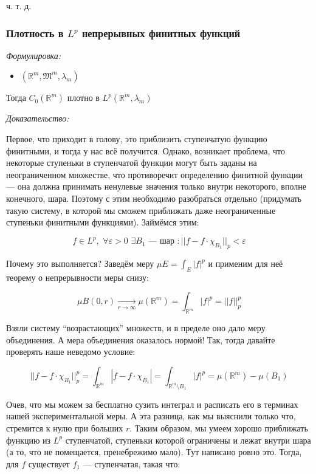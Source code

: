 \documentclass{article}
\def\dbl{\,\,}
\def\goesto#1{\underset{#1}{\longrightarrow}}
\begin{document}
ч. т. д. 

\subsubsection{Плотность в $L^p$ непрерывных финитных функций}
\textit{Формулировка:}

\begin{itemize}
    \item $(\mathbb{R}^{m}, \mathfrak{M}^{m}, \lambda_m)$
\end{itemize}

Тогда $C_0(\mathbb{R}^{m})$ плотно в $L^{p}(\mathbb{R}^{m}, \lambda_m)$

\textit{Доказательство:}

Первое, что приходит в голову, это приблизить ступенчатую функцию финитными, и тогда у нас всё получится. Однако, возникает проблема, что некоторые ступеньки в ступенчатой функции могут быть заданы на неограниченном множестве, что противоречит определению финитной функции --- она должна принимать ненулевые значения только внутри некоторого, вполне конечного, шара. Поэтому с этим необходимо разобраться отдельно (придумать такую систему, в которой мы сможем приближать даже неограниченные ступеньки финитными функциями). Займёмся этим:

\[f \in L^p, \dbl \forall \varepsilon > 0 \dbl \exists B_1 \text{ --- шар }: ||f - f \cdot \chi_{B_1}||_p < \varepsilon\]

Почему это выполняется? Заведём меру $\mu E = \int_{E} |f|^p$ и применим для неё теорему о непрерывности меры снизу:

\[\mu B(0, r) \goesto{r \rightarrow \infty} \mu(\mathbb{R}^m) = \int_{\mathbb{R}^m} |f|^p = ||f||_p^p\]

Взяли систему ``возрастающих'' множеств, и в пределе оно дало меру объединения. А мера объединения оказалось нормой! Так, тогда давайте проверять наше неведомо условие:

\[||f - f \cdot \chi_{B_1}||_p^p = \int_{\mathbb{R}^m} |f - f \cdot \chi_{B_1}| = \int_{\mathbb{R}^m \setminus B_1} |f|^p = \mu(\mathbb{R}^m) - \mu(B_1)\]

Очев, что мы можем за бесплатно сузить интеграл и расписать его в терминах нашей экспериментальной меры. А эта разница, как мы выяснили только что, стремится к нулю при больших $r$. Таким образом, мы умеем хорошо приближать функцию из $L^p$ ступенчатой, ступеньки которой ограничены и лежат внутри шара (а то, что не помещается, пренебрежимо мало). Тут написано ровно это. Тогда, для $f$ существует $f_1$ --- ступенчатая, такая что:
\end{document}
